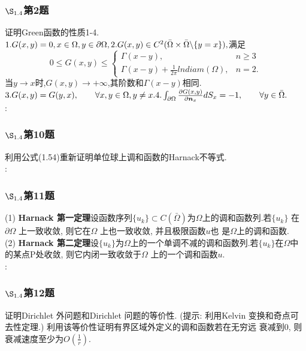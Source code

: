 \documentclass[12pt, a4paper]{article}
\begin{document}
	\subsubsection{$\S_{1.4}$第2题}
	\kaishu{}证明Green函数的性质1-4.\\
	$1.G(x,y)=0,x \in \Omega,y \in \partial \Omega,\\
	2.G(x,y) \in C^2(\bar{\Omega}\times \bar{\Omega} \backslash \{y=x\}),$满足$$
	0\le G(x,y) \le \begin{cases}
	\Gamma(x-y), &n \ge 3\\
	\Gamma(x-y)+\frac{1}{2\pi}lndiam(\Omega), &n=2.
	\end{cases}	$$
	当$y \to x$时,$G(x,y) \to + \infty$,其阶数和$\Gamma(x-y)$相同.\\
	$3.G(x,y)=G(y,x), \qquad \forall x,y \in \Omega, y \ne x.\\
	4.\int_{\partial \Omega} \frac{\partial G(x,y)}{\partial \bm{n}_x}dS_x =-1, \qquad \forall y \in \bar{\Omega}.$\\
	
	\songti{}:\\
	
	
	\subsubsection{$\S_{1.4}$第10题}
	\kaishu{}利用公式(1.54)重新证明单位球上调和函数的Harnack不等式.\\

	\songti{}:\\
	
	\subsubsection{$\S_{1.4}$第11题}
	\kaishu{}
	(1) \textbf{Harnack 第一定理}\quad 设函数序列$\{u_k\} \subset  C(\bar{\Omega}) $为$\Omega$上的调和函数列.若$\{u_k\}$ 在$\partial \Omega$ 上一致收敛, 则它在$\Omega$ 上也一致收敛, 并且极限函数$u $也
	是$\Omega $上的调和函数.\\
	
	(2)\textbf{ Harnack 第二定理}\quad 设$\{u_k\}$为$\Omega$上的一个单调不减的调和函数列.若$\{u_k\}$在$\Omega$中的某点P处收敛, 则它内闭一致收敛于$\Omega$ 上的一个调和函数$u $.\\
	
	\songti{}:\\
	
	\subsubsection{$\S_{1.4}$第12题}
	\kaishu{}证明Dirichlet 外问题和Dirichlet 问题的等价性. (提示: 利用Kelvin 变换和奇点可去性定理.) 利用该等价性证明有界区域外定义的调和函数若在无穷远
	衰减到0, 则衰减速度至少为$O(\frac{1}{r})$.\\
\end{document}
